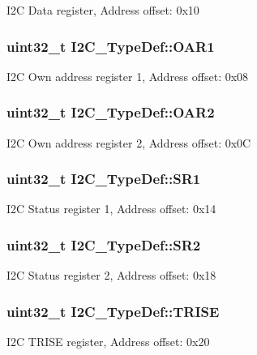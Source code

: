 I2\-C Data register, Address offset\-: 0x10 \hypertarget{struct_i2_c___type_def_ae8269169fcbdc2ecb580208d99c2f89f}{
\subsubsection[{O\-A\-R1}]{ uint32\-\_\-t I2\-C\-\_\-\-Type\-Def\-::\-O\-A\-R1}}\label{struct_i2_c___type_def_ae8269169fcbdc2ecb580208d99c2f89f}
I2\-C Own address register 1, Address offset\-: 0x08 \hypertarget{struct_i2_c___type_def_a73988a218be320999c74a641b3d6e3c1}{
\subsubsection[{O\-A\-R2}]{ uint32\-\_\-t I2\-C\-\_\-\-Type\-Def\-::\-O\-A\-R2}}\label{struct_i2_c___type_def_a73988a218be320999c74a641b3d6e3c1}
I2\-C Own address register 2, Address offset\-: 0x0\-C \hypertarget{struct_i2_c___type_def_a639be124227c03bb3f5fe0e7faf84995}{
\subsubsection[{S\-R1}]{ uint32\-\_\-t I2\-C\-\_\-\-Type\-Def\-::\-S\-R1}}\label{struct_i2_c___type_def_a639be124227c03bb3f5fe0e7faf84995}
I2\-C Status register 1, Address offset\-: 0x14 \hypertarget{struct_i2_c___type_def_ac509048af4b9ac67c808d584fdbc712e}{
\subsubsection[{S\-R2}]{ uint32\-\_\-t I2\-C\-\_\-\-Type\-Def\-::\-S\-R2}}\label{struct_i2_c___type_def_ac509048af4b9ac67c808d584fdbc712e}
I2\-C Status register 2, Address offset\-: 0x18 \hypertarget{struct_i2_c___type_def_a9f1a5aee4a26b2fb30e08f88586c436d}{
\subsubsection[{T\-R\-I\-S\-E}]{ uint32\-\_\-t I2\-C\-\_\-\-Type\-Def\-::\-T\-R\-I\-S\-E}}\label{struct_i2_c___type_def_a9f1a5aee4a26b2fb30e08f88586c436d}
I2\-C T\-R\-I\-S\-E register, Address offset\-: 0x20 

